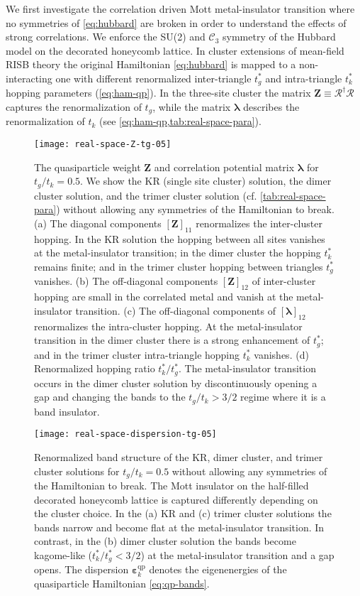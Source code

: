 \documentclass[reprint,aps,prb,amsmath,amssymb]{revtex4-2}
\begin{document}
We first investigate the correlation driven Mott metal-insulator transition where no symmetries of \cref{eq:hubbard} are broken in order to understand the effects of strong correlations. We enforce the SU(2) and $\mathcal{C}_3$ symmetry of the Hubbard model on the decorated honeycomb lattice. In cluster extensions of mean-field RISB theory the original Hamiltonian \cref{eq:hubbard} is mapped to a non-interacting one with different renormalized inter-triangle $t_g^*$ and intra-triangle $t_k^*$ hopping parameters (\cref{eq:ham-qp}). In the three-site cluster the matrix $\bm{Z} \equiv \bm{\mathcal{R}}^{\dagger} \bm{\mathcal{R}}$ captures the renormalization of $t_g$, while the matrix $\bm{\lambda}$ describes the renormalization of $t_k$ (see \cref{eq:ham-qp,tab:real-space-para}). 

\begin{figure}
	\centering
	\texttt{[image: real-space-Z-tg-05]}
	\caption
	{\label{fig:real-Z-tg-05} 
		The quasiparticle weight $\bm{Z}$ and correlation potential matrix $\bm{\lambda}$ for $t_g/t_k = 0.5$. We show the KR (single site cluster) solution, the dimer cluster solution, and the trimer cluster solution (cf. \cref{tab:real-space-para}) without allowing any symmetries of the Hamiltonian to break.
		(a) The diagonal components $[\bm{Z}]_{11}$ renormalizes the inter-cluster hopping. In the KR solution the hopping between all sites vanishes at the metal-insulator transition; in the dimer cluster the hopping $t_k^*$ remains finite; and in the trimer cluster hopping between triangles $t_g^*$ vanishes.
		(b) The off-diagonal components $[\bm{Z}]_{12}$ of inter-cluster hopping are small in the correlated metal and vanish at the metal-insulator transition.
		(c) The off-diagonal components of $[\bm{\lambda}]_{12}$ renormalizes the intra-cluster hopping. At the metal-insulator transition in the dimer cluster there is a strong enhancement of $t_g^*$; and in the trimer cluster intra-triangle hopping $t_k^*$ vanishes.
		(d) Renormalized hopping ratio $t_k^* / t_g^*$. The metal-insulator transition occurs in the dimer cluster solution by discontinuously opening a gap and changing the bands to the $t_g / t_k > 3/2$ regime where it is a band insulator.
	}
\end{figure}

\begin{figure}
	\centering
	\texttt{[image: real-space-dispersion-tg-05]}
	\caption
	{\label{fig:real-space-dispersion-tg-05} 
		Renormalized band structure of the KR, dimer cluster, and trimer cluster solutions for $t_g/t_k = 0.5$ without allowing any symmetries of the Hamiltonian to break.
		The Mott insulator on the half-filled decorated honeycomb lattice is captured differently depending on the cluster choice.
		In the (a) KR and (c) trimer cluster solutions the bands narrow and become flat at the metal-insulator transition. In contrast, in the (b) dimer cluster solution the bands become kagome-like ($t_k^*/t_g^* < 3/2$) at the metal-insulator transition and a gap opens.
		The dispersion $\bm{\varepsilon}^{\mathrm{qp}}_k$ denotes the eigenenergies of the quasiparticle Hamiltonian \cref{eq:qp-bands}.
	}
\end{figure}
\end{document}
